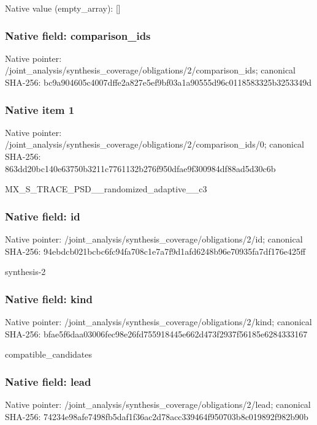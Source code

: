 \documentclass[10pt,a4paper]{article}
\begin{document}
Native value (empty\_\allowbreak{}array): []

\subsubsection{Native field: comparison\_\allowbreak{}ids}
Native pointer: /joint\_\allowbreak{}analysis/synthesis\_\allowbreak{}coverage/obligations/2/comparison\_\allowbreak{}ids; canonical SHA-256: bc9a904605c4007dffe2a827e5ef9bf03a1a90555d96c0118583325b3253349d

\subsubsection{Native item 1}
Native pointer: /joint\_\allowbreak{}analysis/synthesis\_\allowbreak{}coverage/obligations/2/comparison\_\allowbreak{}ids/0; canonical SHA-256: 863dd20bc140e63750b3211c7761132b276f950dfae9f300984df88ad5d30c6b

\begingroup\raggedright\sloppy MX\_\allowbreak{}S\_\allowbreak{}TRACE\_\allowbreak{}PSD\_\allowbreak{}\_\allowbreak{}randomized\_\allowbreak{}adaptive\_\allowbreak{}\_\allowbreak{}c3\par\endgroup

\subsubsection{Native field: id}
Native pointer: /joint\_\allowbreak{}analysis/synthesis\_\allowbreak{}coverage/obligations/2/id; canonical SHA-256: 94ebdcb021bcbc6fc94fa708c1e7a7f9d1afd6248b96e70935fa7df176e425ff

\begingroup\raggedright\sloppy synthesis-2\par\endgroup

\subsubsection{Native field: kind}
Native pointer: /joint\_\allowbreak{}analysis/synthesis\_\allowbreak{}coverage/obligations/2/kind; canonical SHA-256: bfae5f6daa03006fec98e26fd755918445e662d473f2937f56185e6284333167

\begingroup\raggedright\sloppy compatible\_\allowbreak{}candidates\par\endgroup

\subsubsection{Native field: lead}
Native pointer: /joint\_\allowbreak{}analysis/synthesis\_\allowbreak{}coverage/obligations/2/lead; canonical SHA-256: 74234e98afe7498fb5daf1f36ac2d78acc339464f950703b8c019892f982b90b
\end{document}
